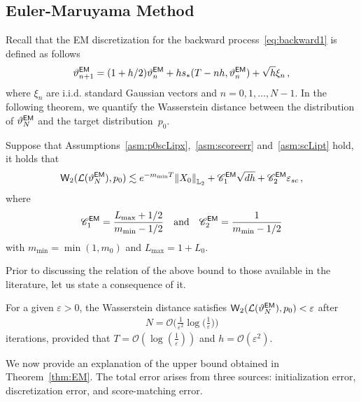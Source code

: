 \documentclass[11pt]{article}
\def\Ltwo{\mathbb L_2}
\def\wass{{\sf W}}
\def\law{{\mathcal L}}
\def\l|{\left\lVert}
\def\r|{\right\rVert}
\begin{document}
\subsection{Euler-Maruyama Method}
Recall that the EM discretization for the backward process~\eqref{eq:backward1} is defined as follows
\begin{align*}
 \vartheta^{\sf EM}_{n+1}=(1+h/2)\vartheta^{\sf EM}_{n}+hs_{*}(T-nh,\vartheta^{\sf EM}_n)+\sqrt{h}\xi_n\,,
\end{align*}
where $\xi_n$ are i.i.d. standard Gaussian vectors and $n=0,1,\dots,N-1$.
In the following theorem, we quantify the Wasserstein distance between the distribution of $ \vartheta_{N}^{\sf EM}$ and the target distribution~$p_0.$
\begin{theorem}
    \label{thm:EM}
    Suppose that Assumptions~\ref{asm:p0scLipx},~\ref{asm:scoreerr} and~\ref{asm:scLipt} hold, it holds that
    \begin{align}
    \label{eq:Wassthm1}
    \wass_2(\law(\vartheta_N^{\sf EM}),p_0)
        \lesssim e^{-m_{\min}T}\l|X_0\r|_{\Ltwo}+\mathscr C_1^{\sf EM}\sqrt{dh}+\mathscr C_2^{\sf EM}\varepsilon_{sc}\,,
    \end{align}
    where 
    \begin{align*}
    \mathscr C_1^{\sf EM}=\dfrac{L_{\max}+1/2}{m_{\min}-1/2}~~\text{ and }~~
    \mathscr C_2^{\sf EM}=\dfrac{1}{m_{\min}-1/2}
    \end{align*}
    with $m_{\min}=\min(1,m_0)$ and  $L_{\max}=1+L_0$.
\end{theorem}
Prior to discussing the relation of the above bound to those available in the literature, let us state a consequence of it.
\begin{corollary}
\label{cor:EM}
For a given $\varepsilon>0$, the Wasserstein distance satisfies $\wass_2(\law(\vartheta_N^{\sf EM}),p_0)<\varepsilon$ after 
    \begin{align*}
    N=\mathcal{O}\bigg(\frac{1}{\varepsilon^2}\log\Big(\frac{1}{\varepsilon}\Big)\bigg)
    \end{align*}
    iterations, provided that
$T=\mathcal{O}\left(\log(\frac{1}{\varepsilon})\right)$ and $h=\mathcal{O}(\varepsilon^2)$.
\end{corollary}
We now provide an explanation of the upper bound obtained in Theorem~\ref{thm:EM}. The total error arises from three sources: initialization error, discretization error, and score-matching error.
\end{document}

